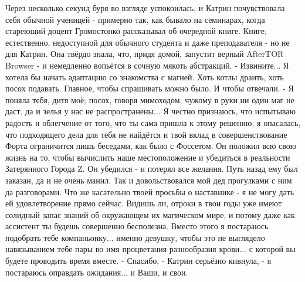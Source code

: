 Через несколько секунд буря во взгляде успокоилась, и Катрин почувствовала себя обычной ученицей - примерно так, как бывало на семинарах, когда стареющий доцент Громостонко рассказывал об очередной книге. Книге, естественно, недоступной для обычного студента и даже преподавателя - но не для Катрин. Она твёрдо знала, что, придя домой, запустит верный AfterTOR Browser - и немедленно вопьётся в сочную мякоть абстракций.
- Извините... Я хотела бы начать адаптацию со знакомства с магией. Хоть котлы драить, хоть посох подавать. Главное, чтобы спрашивать можно было. И чтобы отвечали.
- Я поняла тебя, дитя моё; посох, говоря мимоходом, чужому в руки ни один маг не даст, да и зелья у нас не распространены... Я честно признаюсь, что испытываю радость и облегчение от того, что ты сама пришла к этому решению; я опасалась, что подходящего дела для тебя не найдётся и твой вклад в совершенствование Форта ограничится лишь беседами, как было с Фоссетом.
Он положил всю свою жизнь на то, чтобы вычислить наше местоположение и убедиться в реальности Затерянного Города Z. Он убедился - и потерял все желания. Путь назад ему был заказан, да и не очень манил. Так и довольствовался мой дед прогулками с ним да разговорами.
Что же касательно твоей просьбы о наставнике - я не могу дать ей удовлетворение прямо сейчас. Видишь ли, отроки в твои годы уже имеют солидный запас знаний об окружающем их магическом мире, и потому даже как ассистент ты будешь совершенно бесполезна. Вместо этого я постараюсь подобрать тебе компаньонку... именно девушку, чтобы это не выглядело навязыванием тебе пары во имя процветания разнообразия крови... с которой вы будете проводить время вместе.
- Спасибо, - Катрин серьёзно кивнула, - я постараюсь оправдать ожидания... и Ваши, и свои.
